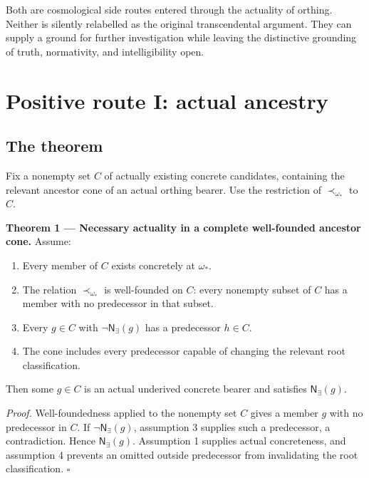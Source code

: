 \documentclass[11pt,a4paper]{article}
\providecommand{\tightlist}{\setlength{\itemsep}{0pt}\setlength{\parskip}{0pt}}
\begin{document}
Both are cosmological side routes entered through the actuality of
orthing. Neither is silently relabelled as the original transcendental
argument. They can supply a ground for further investigation while
leaving the distinctive grounding of truth, normativity, and
intelligibility open.

\section{Positive route I: actual
ancestry}\label{positive-route-i-actual-ancestry}

\subsection{The theorem}\label{the-theorem}

Fix a nonempty set \(C\) of actually existing concrete candidates,
containing the relevant ancestor cone of an actual orthing bearer. Use
the restriction of \(\prec_{\omega_*}\) to \(C\).


\textbf{Theorem 1 --- Necessary actuality in a complete well-founded
ancestor cone.} Assume:

\begin{enumerate}
\def\labelenumi{\arabic{enumi}.}
\tightlist
\item
  Every member of \(C\) exists concretely at \(\omega_*\).
\item
  The relation \(\prec_{\omega_*}\) is well-founded on \(C\): every
  nonempty subset of \(C\) has a member with no predecessor in that
  subset.
\item
  Every \(g\in C\) with \(\neg\mathsf N_{\exists}(g)\) has a predecessor
  \(h\in C\).
\item
  The cone includes every predecessor capable of changing the relevant
  root classification.
\end{enumerate}

Then some \(g\in C\) is an actual underived concrete bearer and
satisfies \(\mathsf N_{\exists}(g)\).

\emph{Proof.} Well-foundedness applied to the nonempty set \(C\) gives a
member \(g\) with no predecessor in \(C\). If
\(\neg\mathsf N_{\exists}(g)\), assumption 3 supplies such a
predecessor, a contradiction. Hence \(\mathsf N_{\exists}(g)\).
Assumption 1 supplies actual concreteness, and assumption 4 prevents an
omitted outside predecessor from invalidating the root classification.
\(\square\)
\end{document}
